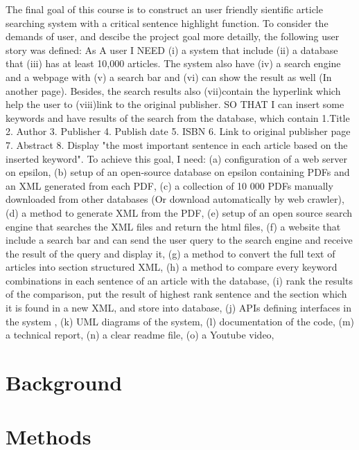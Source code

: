 \documentclass[a4paper,twocolumn,twoside]{article}
\begin{document}
	The final goal of this course is to construct an user friendly sientific article searching system with a critical sentence highlight function.
	To consider the demands of user, and descibe the project goal more detailly, the following user story was defined:  
	As A user I NEED (i) a system that include (ii) a database that (iii) has at least 10,000 articles.
	The system also have (iv) a search engine and a webpage with (v) a search bar and (vi) can show the result as well (In another page).
	Besides, the search results also (vii)contain the hyperlink which help the user to (viii)link to the original publisher.
	SO THAT I can insert some keywords and have results of the search from the database, which contain 1.Title 2. Author 3. Publisher 4. Publish date 5. ISBN 6. Link to original publisher page 7. Abstract 8. Display "the most important sentence in each article based on the inserted keyword".
	To achieve this goal, I need:
	(a) configuration of a web server on epsilon,
	(b) setup of an open-source database on epsilon containing PDFs and an XML generated from each PDF,
	(c) a collection of 10 000 PDFs manually downloaded from other databases (Or download automatically by web crawler),
	(d) a method to generate XML from the PDF,
	(e) setup of an open source search engine that searches the XML files and return the html files,
	(f) a website that include a search bar and can send the user query to the search engine and receive the result of the query and display it,
	(g) a method to convert the full text of articles into section structured XML,
	(h) a method to compare every keyword combinations in each sentence of an article with the database,
	(i) rank the results of the comparison, put the result of highest rank sentence and the section which it is found in a new XML, and store into database,
	(j) APIs defining interfaces in the system , 
	(k) UML diagrams of the system,
	(l) documentation of the code, 
	(m) a technical report,
	(n) a clear readme file,
	(o) a Youtube video,
		
	\section{Background}
	\label{Background}


	\section{Methods}
	\label{Methods}
	
\end{document}
